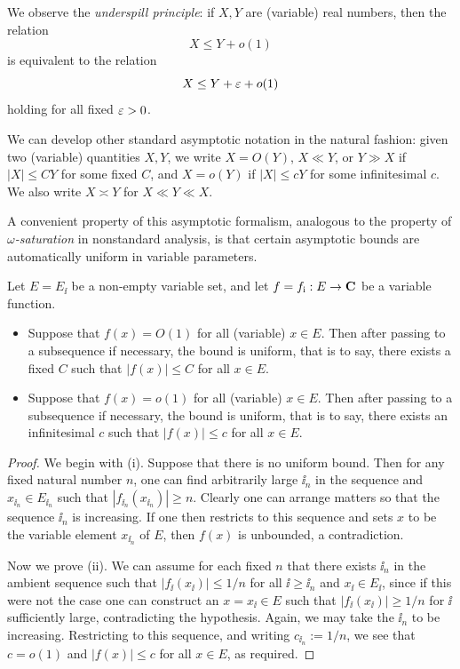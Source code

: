We observe the \emph{underspill principle}: if $X,Y$ are (variable) real numbers, then the relation
$$ X \leq Y + o(1)$$
is equivalent to the relation
$$ X \leq Y + \varepsilon + o(1)$$
holding for all fixed $\varepsilon>0$.

We can develop other standard asymptotic notation in the natural fashion: given two (variable) quantities $X,Y$, we write $X = O(Y)$, $X \ll Y$, or $Y \gg X$ if $|X| \leq CY$ for some fixed $C$, and $X = o(Y)$ if $|X| \leq cY$ for some infinitesimal $c$.  We also write $X \asymp Y$ for $X \ll Y \ll X$.

A convenient property of this asymptotic formalism, analogous to the property of \emph{$\omega$-saturation} in nonstandard analysis, is that certain asymptotic bounds are automatically uniform in variable parameters.

\begin{proposition}\label{auto}
\leanok
Let $E = E_{\ii}$ be a non-empty variable set, and let $f = f_{{\mathrm{i}}}: E \to \mathbf{C}$ be a variable function.  \begin{itemize}
    \item[(i)] Suppose that $f(x)=O(1)$ for all (variable) $x \in E$.  Then after passing to a subsequence if necessary, the bound is uniform, that is to say, there exists a fixed $C$ such that $|f(x)| \leq C$ for all $x \in E$.
    \item[(ii)] Suppose that $f(x)=o(1)$ for all (variable) $x \in E$.  Then after passing to a subsequence if necessary, the bound is uniform, that is to say, there exists an infinitesimal $c$ such that $|f(x)| \leq c$ for all $x \in E$.
\end{itemize}
\end{proposition}

\begin{proof}\leanok We begin with (i).  Suppose that there is no uniform bound.  Then for any fixed natural number $n$, one can find arbitrarily large $\ii_n$ in the sequence and $x_{\ii_n} \in E_{\ii_n}$ such that $|f_{\ii_n}(x_{\ii_n})| \geq n$.  Clearly one can arrange matters so that the sequence $\ii_n$ is increasing.  If one then restricts to this sequence and sets $x$ to be the variable element $x_{\ii_n}$ of $E$, then $f(x)$ is unbounded, a contradiction.

Now we prove (ii).  We can assume for each fixed $n$ that there exists $\ii_n$ in the ambient sequence such that $|f_{\ii}(x_{\ii})| \leq 1/n$ for all $\ii \geq \ii_n$ and $x_{\ii} \in E_{\ii}$, since if this were not the case one can construct an $x = x_{\ii} \in E$ such that $|f_{\ii}(x_{\ii})| \geq 1/n$ for $\ii$ sufficiently large, contradicting the hypothesis.  Again, we may take the $\ii_n$ to be increasing.  Restricting to this sequence, and writing $c_{\ii_n} := 1/n$, we see that $c=o(1)$ and $|f(x)| \leq c$ for all $x \in E$, as required.
\end{proof}

